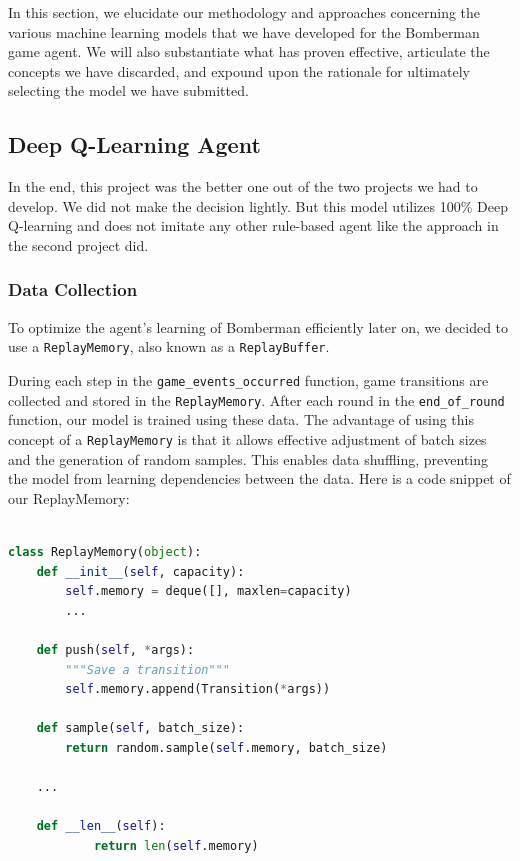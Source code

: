 

In this section, we elucidate our methodology and approaches concerning the various machine learning models 
that we have developed for the Bomberman game agent. We will also substantiate what has proven effective, articulate 
the concepts we have discarded, and expound upon the rationale for ultimately selecting the model we have submitted.


\subsection{Deep Q-Learning Agent}

In the end, this project was the better one out of the two projects we had to develop. We did not make the decision lightly. 
But this model utilizes 100\% Deep Q-learning and does not imitate any other rule-based agent like the approach in the second project did.


\subsubsection{Data Collection}

To optimize the agent's learning of Bomberman efficiently later on, we decided to use a \verb|ReplayMemory|, also known as a \verb|ReplayBuffer|. 

During each step in the \verb|game_events_occurred| function, game transitions are collected and stored in the \verb|ReplayMemory|.
After each round in the \verb|end_of_round| function, 
our model is trained using these data. The advantage of using this concept of a \verb|ReplayMemory| is that it allows effective adjustment of 
batch sizes and the generation of random samples. This enables data shuffling, preventing the model from learning dependencies between the data. 
Here is a code snippet of our ReplayMemory:

\begin{lstlisting}[language=Python]

class ReplayMemory(object):
    def __init__(self, capacity):
        self.memory = deque([], maxlen=capacity)
        ...

    def push(self, *args):
        """Save a transition"""
        self.memory.append(Transition(*args))

    def sample(self, batch_size):
        return random.sample(self.memory, batch_size)
    
    ...

    def __len__(self):
    		return len(self.memory)  

\end{lstlisting}

